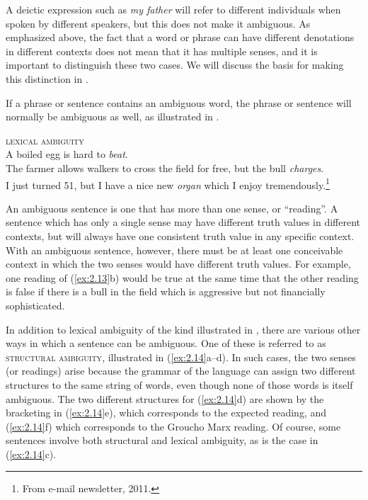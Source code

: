 A deictic expression such as \textit{my father} will refer to different individuals when spoken by different speakers, but this does not make it ambiguous. As emphasized above, the fact that a word or phrase can have different denotations in different contexts does not mean that it has multiple senses, and it is important to distinguish these two cases. We will discuss the basis for making this distinction in .



If a phrase or sentence contains an ambiguous word, the phrase or sentence will normally be ambiguous as well, as illustrated in .


\ea \label{ex:2.13}
\textsc{lexical ambiguity}\\
\ea A boiled egg is hard to \textit{beat}.\\
\ex The farmer allows walkers to cross the field for free, but the bull \textit{charges}.\\
\ex I just turned 51, but I have a nice new \textit{organ} which I enjoy tremendously.\footnote{From e-mail newsletter, 2011.}
                       \z
\z


An ambiguous sentence is one that has more than one sense, or “reading”. A sentence which has only a single sense may have different truth values in different contexts, but will always have one consistent truth value in any specific context. With an ambiguous sentence, however, there must be at least one conceivable context in which the two senses would have different truth values. For example, one reading of (\ref{ex:2.13}b) would be true at the same time that the other reading is false if there is a bull in the field which is aggressive but not financially sophisticated.\largerpage[3]



In addition to lexical ambiguity of the kind illustrated in , there are various other ways in which a sentence can be ambiguous. One of these is referred to as \textsc{structural ambiguity}, illustrated in (\ref{ex:2.14}a--d). In such cases, the two senses (or readings) arise because the grammar of the language can assign two different structures to the same string of words, even though none of those words is itself ambiguous. The two different structures for (\ref{ex:2.14}d) are shown by the bracketing in (\ref{ex:2.14}e), which corresponds to the expected reading, and (\ref{ex:2.14}f) which corresponds to the Groucho Marx reading. Of course, some sentences involve both structural and lexical ambiguity, as is the case in (\ref{ex:2.14}c).


